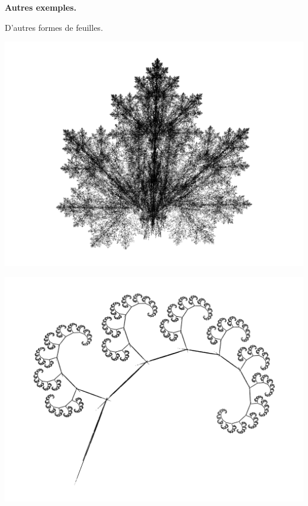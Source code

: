 \documentclass[11pt,class=report,crop=false]{standalone}
\begin{document}
\bigskip

\textbf{Autres exemples.}

D'autres formes de feuilles.

\begin{center}
\includegraphics[scale=\myscale,scale=0.6]{figures/ifs-03}
\end{center}

\begin{center}
\includegraphics[scale=\myscale,scale=0.6]{figures/ifs-04}
\end{center}
\end{document}
